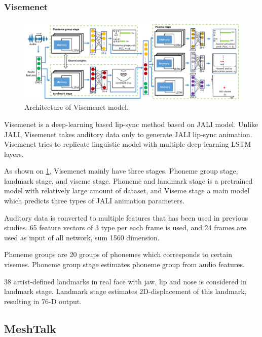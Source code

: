\documentclass[10pt,twocolumn,letterpaper]{article}
\begin{document}
\subsubsection{Visemenet}

\begin{figure}
   \centering
   \includegraphics[width=1.0\linewidth]{VisemenetArchitecture}
   \caption{Architecture of Visemenet model.}
   \label{fig:VisemenetArchitecture}
\end{figure}



Visemenet is a deep-learning based lip-sync method based on JALI model. Unlike JALI, Visemenet takes auditory data only to generate JALI lip-sync animation. Visemenet tries to replicate linguistic model with multiple deep-learning LSTM layers.

As shown on \cref{fig:VisemenetArchitecture}, Visemenet mainly have three stages. Phoneme group stage, landmark stage, and viseme stage. Phoneme and landmark stage is a pretrained model with relatively large amount of dataset, and Viseme stage a main model which predicts three types of JALI animation parameters.

Auditory data is converted to multiple features that has been used in previous studies. 65 feature vectors of 3 type per each frame is used, and 24 frames are used as input of all network, sum 1560 dimension.

Phoneme groups are 20 groups of phonemes which corresponds to certain visemes. Phoneme group stage estimates phoneme group from audio features.

38 artist-defined landmarks in real face with jaw, lip and nose is considered in landmark stage. Landmark stage estimates 2D-displacement of this landmark, resulting in 76-D output.

\subsection{MeshTalk}
\end{document}
